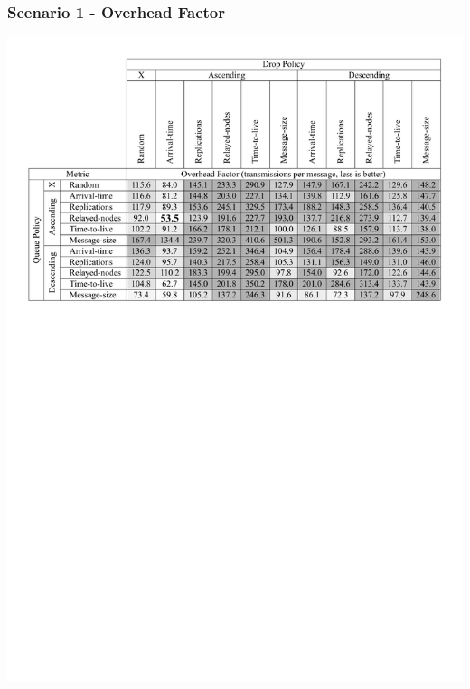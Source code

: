 \begin{frame}
  \frametitle{Scenario 1 - Overhead Factor}
  \begin{center}
   \includegraphics[width=1.0\textwidth]{fig/tables/scenario1_part2.pdf}
  \end{center}
\end{frame}

